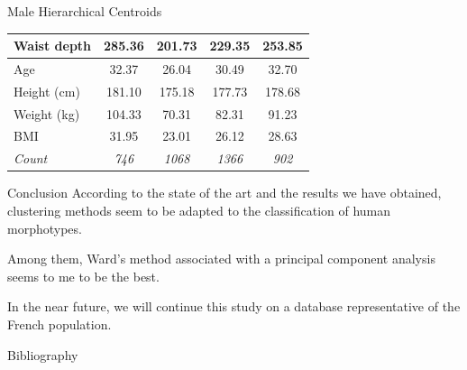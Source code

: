 \documentclass[10pt]{beamer}
\begin{document}
\begin{frame}{Male Hierarchical Centroids}
\begin{tabular}{lcccc}
		Waist depth                  & 285.36                               & 201.73        & 229.35        & 253.85       \\
		\hline
		Age                          & 32.37                                & 26.04         & 30.49         & 32.70        \\
		Height (cm)                  & 181.10                               & 175.18        & 177.73        & 178.68       \\
		Weight (kg)                  & 104.33                               & 70.31         & 82.31         & 91.23        \\
		BMI                          & 31.95                                & 23.01         & 26.12         & 28.63        \\
		\hline
		\textit{Count}               & \textit{746}                         & \textit{1068} & \textit{1366} & \textit{902}
	\end{tabular}
\end{frame}

\begin{frame}{Conclusion}
	According to the state of the art and the results we have obtained, clustering methods seem to be adapted to the classification of human morphotypes.
	
	Among them, Ward's method associated with a principal component analysis seems to me to be the best.
	
	In the near future, we will continue this study on a database representative of the French population.
\end{frame}

\begin{frame}[allowframebreaks]{Bibliography}
	
\end{frame}
\end{document}
